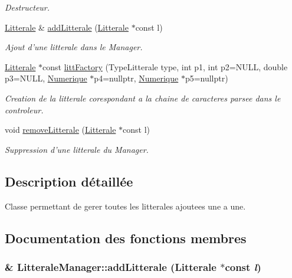 \begin{CompactItemize}
\begin{CompactList}\small\item\em Destructeur. \item\end{CompactList}\item 
\hyperlink{class_litterale}{Litterale} \& \hyperlink{class_litterale_manager_bfb29c7c9e5ffdd6904f069def98d2df}{addLitterale} (\hyperlink{class_litterale}{Litterale} $\ast$const l)
\begin{CompactList}\small\item\em Ajout d'une litterale dans le Manager. \item\end{CompactList}\item 
\hyperlink{class_litterale}{Litterale} $\ast$const \hyperlink{class_litterale_manager_ac254ffc8158f21899786e2133a6018d}{littFactory} (TypeLitterale type, int p1, int p2=NULL, double p3=NULL, \hyperlink{class_numerique}{Numerique} $\ast$p4=nullptr, \hyperlink{class_numerique}{Numerique} $\ast$p5=nullptr)
\begin{CompactList}\small\item\em Creation de la litterale corespondant a la chaine de caracteres parsee dans le controleur. \item\end{CompactList}\item 
void \hyperlink{class_litterale_manager_53bfb9871eed94f6c3e8f5f1e2a76e29}{removeLitterale} (\hyperlink{class_litterale}{Litterale} $\ast$const l)
\begin{CompactList}\small\item\em Suppression d'une litterale du Manager. \item\end{CompactList}\end{CompactItemize}


\subsection{Description détaillée}
Classe permettant de gerer toutes les litterales ajoutees une a une. 

\subsection{Documentation des fonctions membres}
\hypertarget{class_litterale_manager_bfb29c7c9e5ffdd6904f069def98d2df}{
\subsubsection[{addLitterale}]{ \& LitteraleManager::addLitterale ({\bf Litterale} $\ast$const  {\em l})}}
\label{class_litterale_manager_bfb29c7c9e5ffdd6904f069def98d2df}


